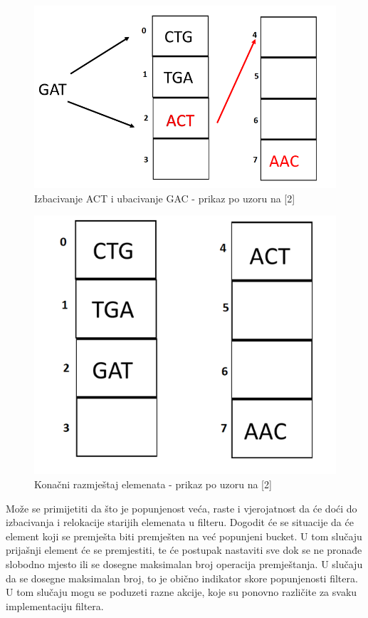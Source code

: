 \documentclass[times, utf8, seminar, numeric]{fer}
\begin{document}
\begin{figure}[H]
  \centering
  \setlength{\intextsep}{5pt}
  \includegraphics[scale = 0.4]{images/swap2.png}
  \caption{Izbacivanje ACT i ubacivanje GAC - prikaz po uzoru na [2]}
  \label{fig_swap2}
\end{figure}

\begin{figure}[H]
  \centering
  \setlength{\intextsep}{5pt}
  \includegraphics[scale = 0.4]{images/finalalign.png}
  \caption{Konačni razmještaj elemenata - prikaz po uzoru na [2]}
  \label{fig_finalalign}
\end{figure}

Može se primijetiti da što je popunjenost veća, raste i vjerojatnost da će doći do izbacivanja i relokacije starijih elemenata u filteru. Dogodit će se situacije da će element koji se premješta biti premješten na već popunjeni bucket. U tom slučaju prijašnji element će se premjestiti, te će postupak nastaviti sve dok se ne pronađe slobodno mjesto ili se dosegne maksimalan broj operacija premještanja. U slučaju da se dosegne maksimalan broj, to je obično indikator skore popunjenosti filtera. U tom slučaju mogu se poduzeti razne akcije, koje su ponovno različite za svaku implementaciju filtera. \\
\end{document}
